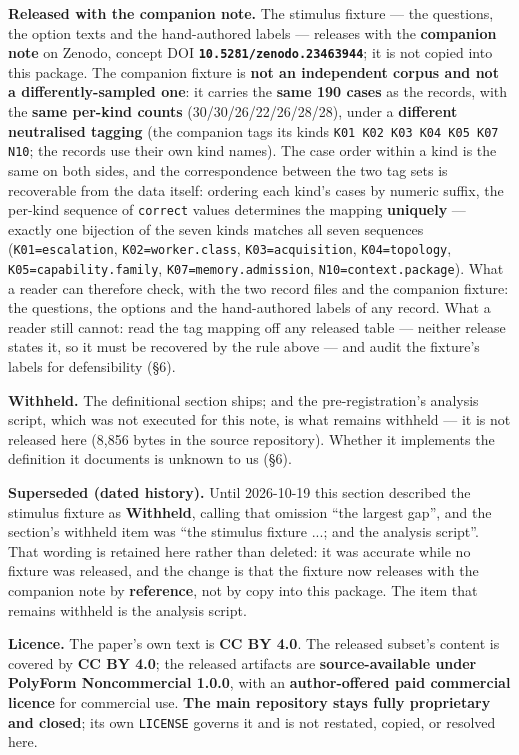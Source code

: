 \documentclass[11pt,a4paper]{article}
\begin{document}
\textbf{Released with the companion note.} The stimulus fixture --- the questions, the option texts and the hand-authored labels --- releases with the \textbf{companion note} on Zenodo, concept DOI \textbf{\texttt{10.5281/zenodo.23463944}}; it is not copied into this package. The companion fixture is \textbf{not an independent corpus and not a differently-sampled one}: it carries the \textbf{same 190 cases} as the records, with the \textbf{same per-kind counts} (30/30/26/22/26/28/28), under a \textbf{different neutralised tagging} (the companion tags its kinds \texttt{K01 K02 K03 K04 K05 K07 N10}; the records use their own kind names). The case order within a kind is the same on both sides, and the correspondence between the two tag sets is recoverable from the data itself: ordering each kind's cases by numeric suffix, the per-kind sequence of \texttt{correct} values determines the mapping \textbf{uniquely} --- exactly one bijection of the seven kinds matches all seven sequences (\texttt{K01=escalation}, \texttt{K02=worker.class}, \texttt{K03=acquisition}, \texttt{K04=topology}, \texttt{K05=capability.family}, \texttt{K07=memory.admission}, \texttt{N10=context.package}). What a reader can therefore check, with the two record files and the companion fixture: the questions, the options and the hand-authored labels of any record. What a reader still cannot: read the tag mapping off any released table --- neither release states it, so it must be recovered by the rule above --- and audit the fixture's labels for defensibility (\S6).

\textbf{Withheld.} The definitional section ships; and the pre-registration's analysis script, which was not executed for this note, is what remains withheld --- it is not released here (8,856 bytes in the source repository). Whether it implements the definition it documents is unknown to us (\S6).

\textbf{Superseded (dated history).} Until 2026-10-19 this section described the stimulus fixture as \textbf{Withheld}, calling that omission ``the largest gap'', and the section's withheld item was ``the stimulus fixture ...; and the analysis script''. That wording is retained here rather than deleted: it was accurate while no fixture was released, and the change is that the fixture now releases with the companion note by \textbf{reference}, not by copy into this package. The item that remains withheld is the analysis script.

\textbf{Licence.} The paper's own text is \textbf{CC BY 4.0}. The released subset's content is covered by \textbf{CC BY 4.0}; the released artifacts are \textbf{source-available under PolyForm Noncommercial 1.0.0}, with an \textbf{author-offered paid commercial licence} for commercial use. \textbf{The main repository stays fully proprietary and closed}; its own \texttt{LICENSE} governs it and is not restated, copied, or resolved here.
\end{document}
